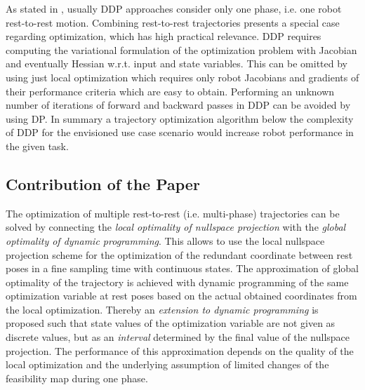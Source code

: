 \documentclass[runningheads]{llncs}
\begin{document}
As stated in \cite{LantoineRus2012}, usually DDP approaches consider only one phase, i.e. one robot rest-to-rest motion.
Combining rest-to-rest trajectories presents a special case regarding optimization, which has high practical relevance.
DDP requires computing the variational formulation of the optimization problem with Jacobian and eventually Hessian w.r.t. input and state variables. 
This can be omitted by using just local optimization which requires only robot Jacobians and gradients of their performance criteria which are easy to obtain.
Performing an unknown number of iterations of forward and backward passes in DDP can be avoided by using DP.
In summary a trajectory optimization algorithm below the complexity of DDP for the envisioned use case scenario would increase robot performance in the given task.

\subsection{Contribution of the Paper}

The optimization of multiple rest-to-rest (i.e. multi-phase) trajectories can be solved by connecting the \emph{local optimality of nullspace projection} with the \emph{global optimality of dynamic programming}.
This allows to use the local nullspace projection scheme for the optimization of the redundant coordinate between rest poses in a fine sampling time with continuous states.
The approximation of global optimality of the trajectory is achieved with dynamic programming of the same optimization variable at rest poses based on the actual obtained coordinates from the local optimization.
Thereby an \emph{extension to dynamic programming} is proposed such that state values of the optimization variable are not given as discrete values, but as an \emph{interval} determined by the final value of the nullspace projection.
The performance of this approximation depends on the quality of the local optimization and the underlying assumption of limited changes of the feasibility map during one phase.
\end{document}
